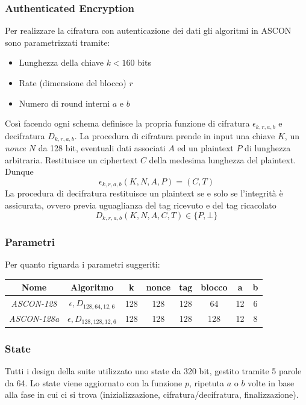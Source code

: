 \subsubsection{Authenticated Encryption}
Per realizzare la cifratura con autenticazione dei dati gli algoritmi in ASCON sono parametrizzati tramite:
\begin{itemize}
    \item Lunghezza della chiave $k < 160$ bits
    \item Rate (dimensione del blocco) $r$
    \item Numero di round interni $a$ e $b$
\end{itemize}
Così facendo ogni schema definisce la propria funzione di cifratura $\epsilon_{k, r, a, b}$ e decifratura $D_{k, r, a, b}$. La procedura di cifratura prende in input una chiave $K$, un \textsl{nonce} $N$ da 128 bit, eventuali dati associati $A$ ed un plaintext $P$ di lunghezza arbitraria. Restituisce un ciphertext $C$ della medesima lunghezza del plaintext. Dunque
\[\epsilon_{k,r,a,b}(K,N,A,P)=(C,T)\]
La procedura di decifratura restituisce un plaintext se e solo se l'integrità è assicurata, ovvero previa uguaglianza del tag ricevuto e del tag ricacolato
\[D_{k,r,a,b}(K,N,A,C,T)\in\{P, \bot\}\]
\subsubsection{Parametri}
Per quanto riguarda i parametri suggeriti:
\begin{table}[h!]
    \centering
    \begin{tabular}{|c|c|c|c|c|c|c|c|}
        \hline
        \textbf{Nome}       & \textbf{Algoritmo}            & \textbf{k} & \textbf{nonce} & \textbf{tag} & \textbf{blocco} & \textbf{a} & \textbf{b} \\
        \hline
        \textsl{ASCON-128}  & $\epsilon, D_{128, 64,12,6}$  & 128        & 128            & 128          & 64              & 12         & 6          \\
        \hline
        \textsl{ASCON-128a} & $\epsilon, D_{128, 128,12,6}$ & 128        & 128            & 128          & 128             & 12         & 8          \\
        \hline
    \end{tabular}
\end{table}

\subsubsection{State}
Tutti i design della suite utilizzato uno state da 320 bit, gestito tramite 5 parole da 64. Lo state viene aggiornato con la funzione $p$, ripetuta $a$ o $b$ volte in base alla fase in cui ci si trova (inizializzazione, cifratura/decifratura, finalizzazione). 


